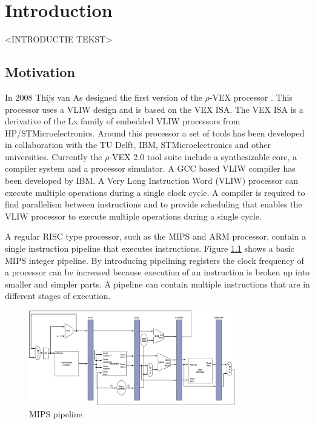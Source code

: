 \chapter{Introduction}
\label{chap:introduction}
<INTRODUCTIE TEKST>
\section{Motivation}
In 2008 Thijs van As designed the first version of the $\rho$-VEX processor \cite{As:2008rt}. This processor uses a VLIW design and is based on the VEX ISA. The VEX ISA is a derivative of the Lx family of embedded VLIW processors \cite{854391} from HP/STMicroelectronics.
Around this processor a set of tools has been developed in collaboration with the TU Delft, IBM, STMicroelectronics and other universities. Currently the $\rho$-VEX 2.0 tool suite include a synthesizable core, a compiler system and a processor simulator. A GCC based VLIW compiler has been developed by IBM.  
A Very Long Instruction Word (VLIW) processor can execute multiple operations during a single clock cycle. A compiler is required to find parallelism between instructions and to provide scheduling that enables the VLIW processor to execute multiple operations during a single cycle.

A regular RISC type processor, such as the MIPS and ARM processor, contain a single instruction pipeline that executes instructions. Figure \ref{fig:mips_pipe} shows a basic MIPS integer pipeline. By introducing pipelining registers the clock frequency of a processor can be increased because execution of an instruction is broken up into smaller and simpler parts. A pipeline can contain multiple instructions that are in different stages of execution.

\begin{figure}[ht]
\centering
\includegraphics[width=0.8\textwidth]{1_introduction/img/MIPS_pipe.png}
\caption{MIPS pipeline \cite{John-L.-Hennessy:2009wq}}
\label{fig:mips_pipe}
\end{figure}

